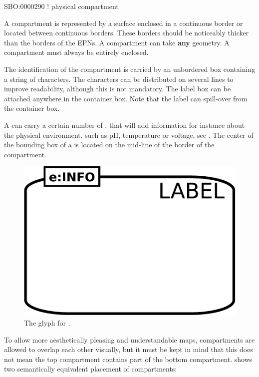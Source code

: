 \begin{glyphDescription}

\glyphSboTerm  SBO:0000290 ! physical compartment 

\glyphContainer A compartment is represented by a surface enclosed in a continuous border or located between continuous borders. These borders should be noticeably thicker than the borders of the EPNs. A compartment can take \textbf{any} geometry. A compartment must always be entirely enclosed.

\glyphLabel The identification of the compartment is carried by an unbordered box containing a string of characters. The characters can be distributed on several lines to improve readability, although this is not mandatory. The label box can be attached anywhere in the container box. Note that the label can spill-over from the container box.

\glyphAux A  can carry a certain number of , that will add information for instance about the physical environment, such as pH, temperature or voltage, see .  The center of the bounding box of a  is located on the mid-line of the border of the compartment.

\end{glyphDescription}

\begin{figure}[H]
  \centering
  \includegraphics[scale = 0.3]{images/compartment}
  \caption{The \PD glyph for .}
  \label{fig:compartment}
\end{figure}


To allow more aesthetically pleasing and understandable maps, compartments are allowed to overlap each other visually, but it must be kept in mind that this does not mean the top compartment contains part of the bottom compartment.   shows two semantically equivalent placement of compartments:

